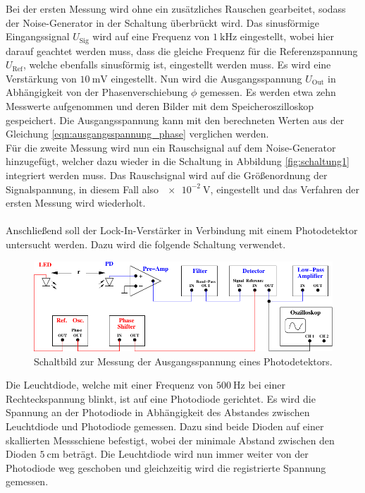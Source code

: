     Bei der ersten Messung wird ohne ein zusätzliches Rauschen gearbeitet,
    sodass der Noise-Generator in der Schaltung überbrückt wird.
    Das sinusförmige Eingangssignal $U_\text{Sig}$ wird auf eine Frequenz von $\SI{1}{\kilo\hertz}$ eingestellt,
    wobei hier darauf geachtet werden muss,
    dass die gleiche Frequenz für die Referenzspannung $U_\text{Ref}$,
    welche ebenfalls sinusförmig ist,
    eingestellt werden muss.
    Es wird eine Verstärkung von $\SI{10}{\milli\volt}$ eingestellt.
    Nun wird die Ausgangsspannung $U_\text{Out}$ in Abhängigkeit von der Phasenverschiebung $\phi$ gemessen.
    Es werden etwa zehn Messwerte aufgenommen und deren Bilder mit dem Speicheroszilloskop gespeichert.
    Die Ausgangsspannung kann mit den berechneten Werten aus der Gleichung \eqref{eqn:ausgangsspannung_phase} verglichen werden.\\%
    Für die zweite Messung wird nun ein Rauschsignal auf dem Noise-Generator hinzugefügt,
    welcher dazu wieder in die Schaltung in Abbildung \ref{fig:schaltung1} integriert werden muss.
    Das Rauschsignal wird auf die Größenordnung der Signalspannung,
    in diesem Fall also $\SI{e-2}{\volt}$,
    eingestellt und das Verfahren der ersten Messung wird wiederholt.\\
    \\
    Anschließend soll der Lock-In-Verstärker in Verbindung mit einem Photodetektor untersucht werden.
    Dazu wird die folgende Schaltung verwendet.
    \begin{figure}[H]
        \centering
        \includegraphics[scale=1]{content/img/Abb_5.pdf}
        \caption{Schaltbild zur Messung der Ausgangsspannung eines Photodetektors.}
        \label{fig:schaltung2}
    \end{figure}
    Die Leuchtdiode,
    welche mit einer Frequenz von $\SI{500}{\hertz}$ bei einer Rechteckspannung %
    blinkt,
    ist auf eine Photodiode gerichtet.
    Es wird die Spannung an der Photodiode in Abhängigkeit des Abstandes zwischen Leuchtdiode und Photodiode gemessen.
    Dazu sind beide Dioden auf einer skallierten Messschiene befestigt,
    wobei der minimale Abstand zwischen den Dioden $\SI{5}{\centi\meter}$ beträgt.
    Die Leuchtdiode wird nun immer weiter von der Photodiode weg geschoben und gleichzeitig wird die registrierte Spannung gemessen.

        